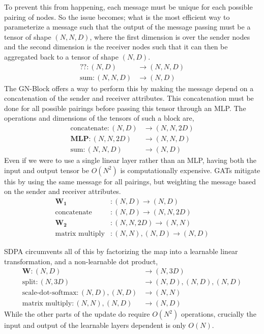 To prevent this from happening, each message must be unique for each possible pairing of nodes.
So the issue becomes; what is the most efficient way to parameterize a message such that the output of the message passing must be a tensor of shape $(N, N, D)$, where the first dimension is over the sender nodes and the second dimension is the receiver nodes such that it can then be aggregated back to a tensor of shape $(N, D)$.
\begin{align}
    \text{??}: (N, D) & \rightarrow (N, N, D) \\
    \text{sum}: (N, N, D) & \rightarrow (N, D)
\end{align}
The GN-Block offers a way to perform this by making the message depend on a concatenation of the sender and receiver attributes.
This concatenation must be done for all possible pairings before passing this tensor through an MLP.
The operations and dimensions of the tensors of such a block are,
\begin{align}
    \text{concatenate}: (N, D) & \rightarrow (N, N, 2D) \\
    \mathbf{MLP}: (N, N, 2D) & \rightarrow (N, N, D) \\
    \text{sum}: (N, N, D) & \rightarrow (N, D)
\end{align}
Even if we were to use a single linear layer rather than an MLP, having both the input and output tensor be $O(N^2)$ is computationally expensive.
GATs mitigate this by using the same message for all pairings, but weighting the message based on the sender and receiver attributes.
\begin{align}
    \mathbf{W_1}&: (N, D)  \rightarrow (N, D) \\
    \text{concatenate}&: (N, D)  \rightarrow (N, N, 2D) \\
    \mathbf{W_2}&: (N, N, 2D)  \rightarrow (N, N) \\
    \text{matrix multiply}&: (N, N), (N, D)  \rightarrow (N, D)
\end{align}

SDPA circumvents all of this by factorizing the map into a learnable linear transformation, and a non-learnable dot product,
\begin{align}
    \mathbf{W}: (N, D) & \rightarrow (N, 3D) \\
    \text{split}: (N, 3D) & \rightarrow (N, D), (N, D), (N, D) \\
    \text{scale-dot-softmax}: (N, D), (N, D) & \rightarrow (N, N) \\
    \text{matrix multiply}: (N, N), (N, D) & \rightarrow (N, D)
\end{align}
While the other parts of the update do require $O(N^2)$ operations, crucially the input and output of the learnable layers dependent is only $O(N)$.

